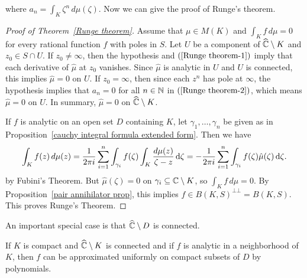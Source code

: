 where $a_n=\int_K\zeta^n\,d\mu(\zeta)$. Now we can give the proof of Runge's theorem.
\begin{proof}[Proof of Theorem~\ref{Runge theorem}]
Assume that $\mu\in M(K)$ and $\int_Kf\,d\mu=0$ for every rational function $f$ with poles in $S$. Let $U$ be a component of $\widehat{\mathbb{C}}\setminus K$ and $z_0\in S\cap U$. If $z_0\neq\infty$, then the hypothesis and $(\ref{Runge theorem-1})$ imply that each derivative of $\hat{\mu}$ at $z_0$ vanishes. Since $\hat{\mu}$ is analytic in $U$ and $U$ is connected, this implies $\hat{\mu}=0$ on $U$. If $z_0=\infty$, then since each $z^n$ has pole at $\infty$, the hypothesis implies that $a_n=0$ for all $n\in\mathbb{N}$ in $(\ref{Runge theorem-2})$, which means $\hat{\mu}=0$ on $U$. In summary, $\hat{\mu}=0$ on $\widehat{\mathbb{C}}\setminus K$.\par
If $f$ is analytic on an open set $D$ containing $K$, let $\gamma_1,\dots,\gamma_n$ be given as in Proposition~\ref{cauchy integral formula extended form}. Then we have
\begin{align*}
\int_Kf(z)\,d\mu(z)=\frac{1}{2\pi i}\sum_{i=1}^{n}\int_{\gamma_i}f(\zeta)\int_K\frac{d\mu(z)}{\zeta-z}\mathop{}\!\mathrm{d}\zeta=-\frac{1}{2\pi i}\sum_{i=1}^{n}\int_{\gamma_i}f(\zeta)\hat{\mu}(\zeta)\mathop{}\!\mathrm{d}\zeta.
\end{align*}
by Fubini's Theorem. But $\hat{\mu}(\zeta)=0$ on $\gamma_i\subseteq\mathbb{C}\setminus K$, so $\int_Kf\,d\mu=0$. By Proposition~\ref{pair annihilator prop}, this implies $f\in B(K,S)^{\bot\bot}=B(K,S)$. This proves Runge's Theorem.
\end{proof}
An important special case is that $\widehat{\mathbb{C}}\setminus D$ is connected.
\begin{corollary}
If $K$ is compact and $\widehat{\mathbb{C}}\setminus K$ is connected and if $f$ is analytic in a neighborhood of $K$, then $f$ can be approximated uniformly on compact subsets of $D$ by polynomials.
\end{corollary}
